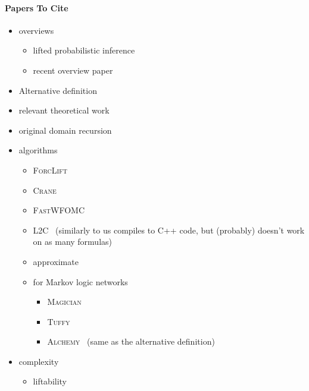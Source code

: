 \documentclass{article}
\theoremstyle{definition}
\theoremstyle{remark}
\begin{document}
\paragraph{Papers To Cite}
\begin{itemize}
  \item overviews
        \begin{itemize}
          \item lifted probabilistic inference~\cite{DBLP:conf/ecai/Kersting12}
          \item recent overview paper~\cite{DBLP:conf/ijcai/Kuzelka23}
        \end{itemize}
  \item Alternative definition~\cite{DBLP:journals/cacm/GogateD16}
  \item relevant theoretical work~\cite{DBLP:conf/aaai/MalhotraS22}
  \item original domain recursion~\cite{DBLP:conf/nips/Broeck11}
  \item algorithms
        \begin{itemize}
          \item \textsc{ForcLift}~\cite{DBLP:conf/ijcai/BroeckTMDR11}
          \item \textsc{Crane}~\cite{DBLP:conf/kr/DilkasB23}
          \item \textsc{FastWFOMC}~\cite{DBLP:conf/uai/BremenK21}
          \item \textsc{L2C}~\cite{DBLP:conf/kr/KazemiP16} (similarly to us
                compiles to C++ code, but (probably) doesn't work on as many
                formulas)
          \item approximate~\cite{DBLP:conf/ijcai/BremenK20}
          \item for Markov logic networks~\cite{DBLP:journals/ml/RichardsonD06}
                \begin{itemize}
                  \item \textsc{Magician}~\cite{DBLP:conf/aaai/VenugopalSG15}
                  \item \textsc{Tuffy}~\cite{DBLP:journals/pvldb/NiuRDS11}
                  \item \textsc{Alchemy}~\cite{DBLP:journals/cacm/GogateD16}
                        (same as the alternative definition)
                \end{itemize}
        \end{itemize}
  \item complexity
        \begin{itemize}
          \item liftability~\cite{DBLP:conf/starai/JaegerB12}

\end{itemize}
\end{itemize}
\end{document}

